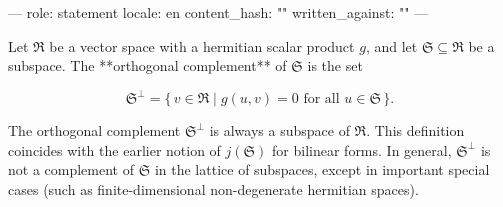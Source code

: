 ---
role: statement
locale: en
content_hash: ""
written_against: ""
---

Let $\mathfrak{R}$ be a vector space with a hermitian scalar product $g$, and let $\mathfrak{S} \subseteq \mathfrak{R}$ be a subspace. The **orthogonal complement** of $\mathfrak{S}$ is the set

$$\mathfrak{S}^{\perp} = \{\, v \in \mathfrak{R} \mid g(u, v) = 0 \text{ for all } u \in \mathfrak{S} \,\}.$$

The orthogonal complement $\mathfrak{S}^{\perp}$ is always a subspace of $\mathfrak{R}$. This definition coincides with the earlier notion of $j(\mathfrak{S})$ for bilinear forms. In general, $\mathfrak{S}^{\perp}$ is not a complement of $\mathfrak{S}$ in the lattice of subspaces, except in important special cases (such as finite-dimensional non-degenerate hermitian spaces).
